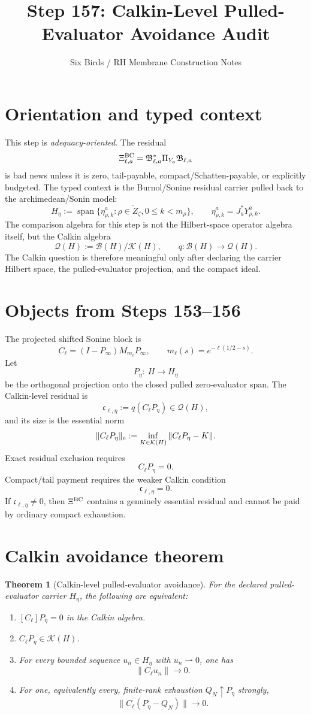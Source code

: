 \documentclass[11pt]{article}
\title{Step 157: Calkin-Level Pulled-Evaluator Avoidance Audit}
\author{Six Birds / RH Membrane Construction Notes}
\date{}
\newtheorem{theorem}{Theorem}
\begin{document}
\maketitle

\section*{Orientation and typed context}
This step is \emph{adequacy-oriented}.  The residual
\[
  \Xi^{\rm BC}_{\ell,a}=\mathfrak B_{\ell,a}^{*}\Pi_{Y_a}\mathfrak B_{\ell,a}
\]
is bad news unless it is zero, tail-payable, compact/Schatten-payable, or explicitly budgeted.  The typed context is the Burnol/Sonine residual carrier pulled back to the archimedean/Sonin model:
\[
  H_\eta:=\overline{\operatorname{span}\{\eta^a_{\rho,k}:\rho\in Z_\zeta,
  0\leq k<m_\rho\}},\qquad
  \eta^a_{\rho,k}=J_a^*Y^a_{\rho,k}.
\]
The comparison algebra for this step is not the Hilbert-space operator algebra itself, but the Calkin algebra
\[
  \mathcal Q(H):=\mathcal B(H)/\mathcal K(H),
  \qquad q:\mathcal B(H)\to\mathcal Q(H).
\]
The Calkin question is therefore meaningful only after declaring the carrier Hilbert space, the pulled-evaluator projection, and the compact ideal.

\section*{Objects from Steps 153--156}
The projected shifted Sonine block is
\[
  C_\ell=(I-P_\infty)M_{m_\ell}P_\infty,
  \qquad m_\ell(s)=e^{-\ell(1/2-s)}.
\]
Let
\[
  P_\eta:\ H\to H_\eta
\]
be the orthogonal projection onto the closed pulled zero-evaluator span.  The Calkin-level residual is
\[
  \mathfrak c_{\ell,\eta}:=q(C_\ell P_\eta)\in \mathcal Q(H),
\]
and its size is the essential norm
\[
  \|C_\ell P_\eta\|_{\rm e}
  :=\inf_{K\in\mathcal K(H)}\|C_\ell P_\eta-K\|.
\]
Exact residual exclusion requires
\[
  C_\ell P_\eta=0.
\]
Compact/tail payment requires the weaker Calkin condition
\[
  \boxed{\mathfrak c_{\ell,\eta}=0.}
\]
If \(\mathfrak c_{\ell,\eta}\neq0\), then \(\Xi^{\rm BC}\) contains a genuinely essential residual and cannot be paid by ordinary compact exhaustion.

\section*{Calkin avoidance theorem}
\begin{theorem}[Calkin-level pulled-evaluator avoidance]
For the declared pulled-evaluator carrier \(H_\eta\), the following are equivalent:
\begin{enumerate}[label=(\roman*)]
  \item \([C_\ell]P_\eta=0\) in the Calkin algebra.
  \item \(C_\ell P_\eta\in\mathcal K(H)\).
  \item For every bounded sequence \(u_n\in H_\eta\) with \(u_n\rightharpoonup0\), one has
  \[
     \|C_\ell u_n\|\to0.
  \]
  \item For one, equivalently every, finite-rank exhaustion \(Q_N\uparrow P_\eta\) strongly,
  \[
     \|C_\ell(P_\eta-Q_N)\|\to0.
  \]
\end{enumerate}
\end{theorem}
\end{document}
